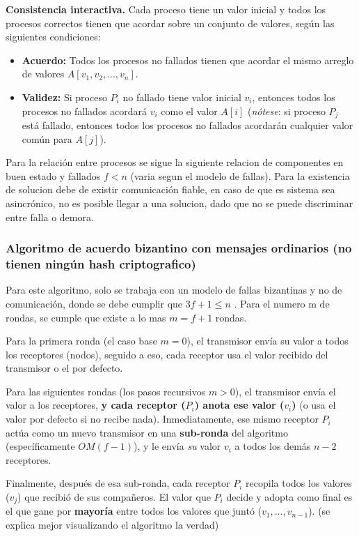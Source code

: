 \textbf{Consistencia interactiva.} Cada proceso tiene un valor inicial y todos los procesos correctos tienen que acordar sobre un conjunto de valores, según las siguientes condiciones:
\begin{itemize}
    \item \textbf{Acuerdo:} Todos los procesos no fallados tienen que acordar el mismo arreglo de valores $A[v_1, v_2, \dots, v_n]$.
    \item \textbf{Validez:} Si proceso $P_i$ no fallado tiene valor inicial $v_i$, entonces todos los procesos no fallados acordará $v_i$ como el valor $A[i]$ (\textit{nótese}: si proceso $P_j$ está fallado, entonces todos los procesos no fallados acordarán cualquier valor común para $A[j]$).
\end{itemize}

Para la relación entre procesos se sigue la siguiente relacion de componentes en buen estado y fallados $f<n$ (varia segun el modelo de fallas). Para la existencia de solucion debe de existir comunicación fiable, en caso de que es sistema sea asincrónico, no es posible llegar a una solucion, dado que no se puede discriminar entre falla o demora.

\subsubsection{Algoritmo de acuerdo bizantino con mensajes ordinarios (no tienen ningún hash criptografico)}

Para este algoritmo, solo se trabaja con un modelo de fallas bizantinas y no de comunicación, donde se debe cumplir que $3f+1\leq n$ . Para el numero m de rondas, se cumple que existe a lo mas $m= f+1$ rondas.

Para la primera ronda (el caso base $m = 0$), el transmisor envía su valor a todos los receptores (nodos), seguido a eso, cada receptor usa el valor recibido del transmisor o el por defecto.

Para las siguientes rondas (los pasos recursivos $m > 0$), el transmisor envía el valor a los receptores, \textbf{y cada receptor ($P_i$) anota ese valor ($v_i$)} (o usa el valor por defecto si no recibe nada). Inmediatamente, ese mismo receptor $P_i$ actúa como un nuevo transmisor en una \textbf{sub-ronda} del algoritmo (específicamente $OM(f-1)$), y le envía \textit{su} valor $v_i$ a todos los demás $n-2$ receptores.

Finalmente, después de esa sub-ronda, cada receptor $P_i$ recopila todos los valores ($v_j$) que recibió de sus compañeros. El valor que $P_i$ decide y adopta como final es el que gane por \textbf{mayoría} entre todos los valores que juntó ($v_1, \dots, v_{n-1}$). (se explica mejor visualizando el algoritmo la verdad)

